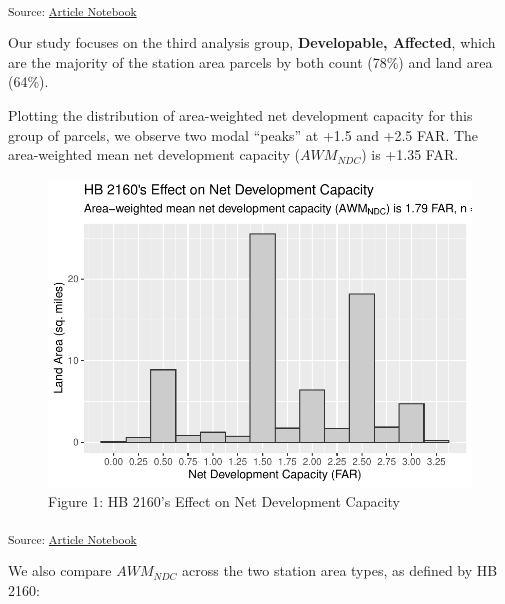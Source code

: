 \documentclass[
]{agujournal2019}
\begin{document}
\textsubscript{Source:
\href{https://tiernanmartin.github.io/2024-transit-oriented-development-bill/index.qmd.html}{Article
Notebook}}

Our study focuses on the third analysis group, \textbf{Developable,
Affected}, which are the majority of the station area parcels by both
count (78\%) and land area (64\%).

Plotting the distribution of area-weighted net development capacity for
this group of parcels, we observe two modal ``peaks'' at +1.5 and +2.5
FAR. The area-weighted mean net development capacity (\(AWM_{NDC}\)) is
+1.35 FAR.

\begin{figure}[H]

{\centering \includegraphics{index_files/figure-pdf/results-histogram-affected-1.pdf}

}

\caption{Figure 1: HB 2160's Effect on Net Development Capacity}

\end{figure}%

\textsubscript{Source:
\href{https://tiernanmartin.github.io/2024-transit-oriented-development-bill/index.qmd.html}{Article
Notebook}}

We also compare \(AWM_{NDC}\) across the two station area types, as
defined by HB 2160:
\end{document}
